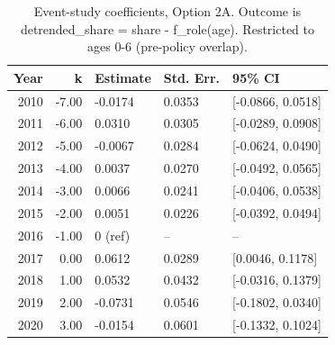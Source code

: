 \begin{table}[ht]
\centering
\caption{Event-study coefficients, Option 2A. Outcome is detrended_share = share - f_role(age). Restricted to ages 0-6 (pre-policy overlap).} 
\label{tab:phase4_within_intensive_did_prepolicy_baseline_eventstudy_2a}
\begin{tabular}{rrlll}
  \toprule
Year & k & Estimate & Std. Err. & 95\% CI \\ 
  \midrule
2010 & -7.00 & -0.0174 & 0.0353 & [-0.0866, 0.0518] \\ 
  2011 & -6.00 & 0.0310 & 0.0305 & [-0.0289, 0.0908] \\ 
  2012 & -5.00 & -0.0067 & 0.0284 & [-0.0624, 0.0490] \\ 
  2013 & -4.00 & 0.0037 & 0.0270 & [-0.0492, 0.0565] \\ 
  2014 & -3.00 & 0.0066 & 0.0241 & [-0.0406, 0.0538] \\ 
  2015 & -2.00 & 0.0051 & 0.0226 & [-0.0392, 0.0494] \\ 
  2016 & -1.00 & 0 (ref) & -- & -- \\ 
  2017 & 0.00 & 0.0612 & 0.0289 & [0.0046, 0.1178] \\ 
  2018 & 1.00 & 0.0532 & 0.0432 & [-0.0316, 0.1379] \\ 
  2019 & 2.00 & -0.0731 & 0.0546 & [-0.1802, 0.0340] \\ 
  2020 & 3.00 & -0.0154 & 0.0601 & [-0.1332, 0.1024] \\ 
   \bottomrule
\end{tabular}
\end{table}
